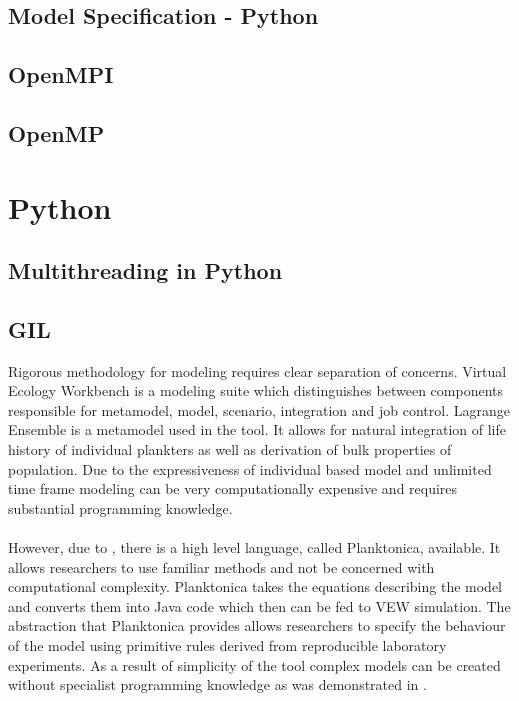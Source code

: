 \documentclass[12pt, a4paper]{report}
\begin{document}
\subsection{Model Specification - Python}\label{subsec:model-spec-py}

\subsection{OpenMPI}\label{subsec:openmpi}

\subsection{OpenMP}\label{subsec:openmpi}

\section{Python}\label{sec:python}

\subsection{Multithreading in Python}\label{subsec:mult-py}

\subsection{GIL}\label{subsec:GIL}

Rigorous methodology for modeling requires clear separation of concerns. Virtual Ecology Workbench \cite{Woods2005}
is a modeling suite which distinguishes between components responsible for metamodel, model, scenario,
integration and job control. Lagrange Ensemble is a metamodel used in the tool. It allows for natural
integration of life history of individual plankters as well as derivation of bulk properties of population.
Due to the expressiveness of individual based model and unlimited time frame modeling can be very
computationally expensive and requires substantial programming knowledge.
\\\\
However, due to \cite{Planktonica}, there is a high level language, called Planktonica, available. It
allows researchers to use familiar methods and not be concerned with computational complexity. Planktonica
takes the equations describing the model and converts them into Java code which then can be fed to VEW
simulation. The abstraction that Planktonica provides allows researchers to specify the behaviour of the
model using primitive rules derived from reproducible laboratory experiments. As a result of simplicity of
the tool complex models can be created without specialist programming knowledge as was demonstrated
in \cite{IndvPlanktonEcosystems}.
\end{document}
